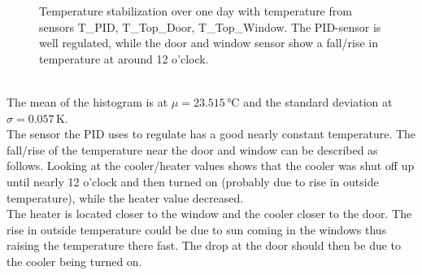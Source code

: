 \documentclass[12pt]{scrartcl}
\begin{document}
\begin{figure}[h!]
          \caption{Temperature stabilization over one day with temperature from
          sensors T\_PID, T\_Top\_Door, T\_Top\_Window. The PID-sensor is well
          regulated, while the door and window sensor show a fall/rise in temperature
          at around 12 o'clock.}
          \label{fig11}
        \end{figure} \\
        The mean of the histogram is at $\mu = 23.515\,\text{°C}$ and the standard
        deviation at $\sigma = 0.057\,\text{K}$. \\
        The sensor the PID uses to regulate has a good
        nearly constant temperature. The fall/rise of the temperature near
        the door and window can be described as follows. Looking
        at the cooler/heater values shows that the cooler was shut off up
        until nearly 12 o'clock and then turned on (probably due to rise in
        outside temperature), while the heater value decreased. \\
        The heater is located closer to the window and the cooler closer to the
        door.
        The rise in outside temperature could be due to sun coming in the
        windows thus raising the temperature there fast. The drop at the door
        should then be due to the cooler being turned on.
\end{document}
